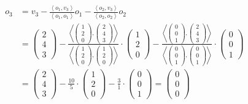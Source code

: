 \documentclass[german,12pt]{homework}
\newcommand{\dotproduct}[2]{\left\langle#1, #2\right\rangle}
\begin{document}
    \begin{align*}
        o_3 &= v_3 - \frac{\dotproduct{o_1}{v_3}}{\dotproduct{o_1}{o_1}}o_1 - \frac{\dotproduct{o_2}{v_3}}{\dotproduct{o_2}{o_2}}o_2\\
        &= \begin{pmatrix}2\\4\\3\end{pmatrix} - \frac{\dotproduct{\begin{pmatrix}1\\2\\0\end{pmatrix}}{\begin{pmatrix}2\\4\\3\end{pmatrix}}}{\dotproduct{\begin{pmatrix}1\\2\\0\end{pmatrix}}{\begin{pmatrix}1\\2\\0\end{pmatrix}}} \cdot \begin{pmatrix}1\\2\\0\end{pmatrix} - \frac{\dotproduct{\begin{pmatrix}0\\0\\1\end{pmatrix}}{\begin{pmatrix}2\\4\\3\end{pmatrix}}}{\dotproduct{\begin{pmatrix}0\\0\\1\end{pmatrix}}{\begin{pmatrix}0\\0\\1\end{pmatrix}}} \cdot \begin{pmatrix}0\\0\\1\end{pmatrix}\\
        &= \begin{pmatrix}2\\4\\3\end{pmatrix} - \frac{10}{5} \cdot \begin{pmatrix}1\\2\\0\end{pmatrix} - \frac{3}{1} \cdot \begin{pmatrix}0\\0\\1\end{pmatrix} = \begin{pmatrix}0\\0\\0\end{pmatrix}

\end{align*}
\end{document}
